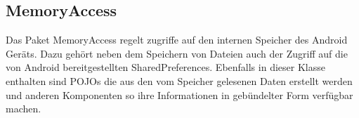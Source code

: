 \subsection{MemoryAccess}  \label{module:memoryaccess}
Das Paket MemoryAccess regelt zugriffe auf den internen Speicher des Android Geräts. Dazu gehört neben dem Speichern von Dateien auch der Zugriff auf die von Android bereitgestellten SharedPreferences. Ebenfalls in dieser Klasse enthalten sind POJOs die aus den vom Speicher gelesenen Daten erstellt werden und anderen Komponenten so ihre Informationen in gebündelter Form verfügbar machen.